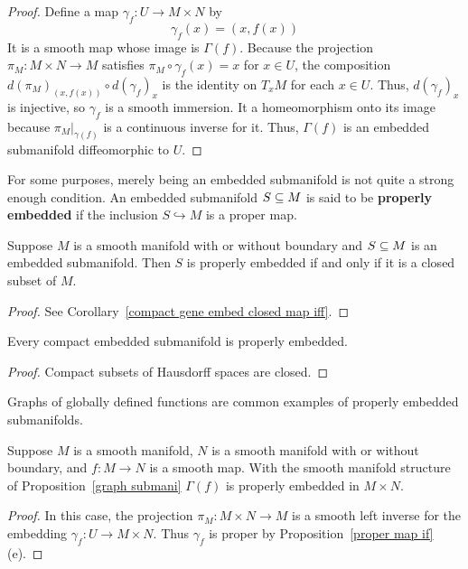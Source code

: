 \begin{proof}
Define a map $\gamma_f:U\to M\times N$ by
\[\gamma_f(x)=(x,f(x))\]
It is a smooth map whose image is $\Gamma(f)$. Because the projection $\pi_M:M\times N\to M$ satisfies $\pi_M\circ\gamma_f(x)=x$ for $x\in U$, the composition $d(\pi_M)_{(x,f(x))}\circ d(\gamma_f)_x$ is the identity on $T_xM$ for each $x\in U$. Thus, $d(\gamma_f)_x$ is injective, so $\gamma_f$ is a smooth immersion. It a homeomorphism onto its image because $\pi_M|_{\gamma(f)}$ is a continuous inverse for it. Thus, $\Gamma(f)$ is an embedded submanifold diffeomorphic to $U$.
\end{proof}
For some purposes, merely being an embedded submanifold is not quite a strong enough condition. An embedded submanifold $S\subseteq M$ is said to be \textbf{properly embedded} if the inclusion $S\hookrightarrow M$ is a proper map.
\begin{proposition}\label{proper embedd iff}
Suppose $M$ is a smooth manifold with or without boundary and $S\subseteq M$ is an embedded submanifold. Then $S$ is properly embedded if and only if it is a closed subset of $M$.
\end{proposition}
\begin{proof}
See Corollary~\ref{compact gene embed closed map iff}.
\end{proof}
\begin{corollary}
Every compact embedded submanifold is properly embedded.
\end{corollary}
\begin{proof}
Compact subsets of Hausdorff spaces are closed.
\end{proof}
Graphs of globally defined functions are common examples of properly embedded
submanifolds.
\begin{proposition}
Suppose $M$ is a smooth manifold, $N$ is a smooth manifold with or without boundary, and $f:M\to N$ is a smooth map. With the smooth manifold structure of Proposition~\ref{graph submani} $\Gamma(f)$ is properly embedded in $M\times N$.
\end{proposition}
\begin{proof}
In this case, the projection $\pi_M:M\times N\to M$ is a smooth left inverse for
the embedding $\gamma_f:U\to M\times N$. Thus $\gamma_f$ is proper by Proposition~\ref{proper map if}(e).
\end{proof}
